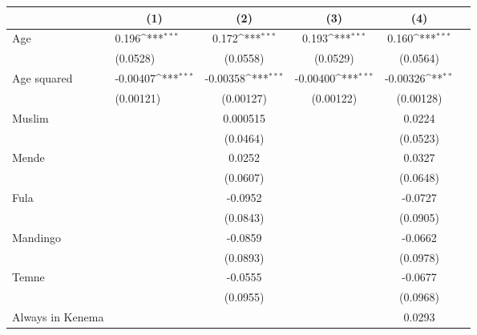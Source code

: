 {
\def\sym#1{\ifmmode^{#1}\else\(^{#1}\)\fi}
\begin{tabularx}{\textwidth}{Xl*{4}{c}}
\hline\hline
                    &\multicolumn{1}{c}{(1)}         &\multicolumn{1}{c}{(2)}         &\multicolumn{1}{c}{(3)}         &\multicolumn{1}{c}{(4)}         \\
\hline
Age                 &       0.196\sym{***}&       0.172\sym{***}&       0.193\sym{***}&       0.160\sym{***}\\
                    &    (0.0528)         &    (0.0558)         &    (0.0529)         &    (0.0564)         \\
[0.5em]
Age squared         &    -0.00407\sym{***}&    -0.00358\sym{***}&    -0.00400\sym{***}&    -0.00326\sym{**} \\
                    &   (0.00121)         &   (0.00127)         &   (0.00122)         &   (0.00128)         \\
[0.5em]
Muslim              &                     &    0.000515         &                     &      0.0224         \\
                    &                     &    (0.0464)         &                     &    (0.0523)         \\
[0.5em]
Mende               &                     &      0.0252         &                     &      0.0327         \\
                    &                     &    (0.0607)         &                     &    (0.0648)         \\
[0.5em]
Fula                &                     &     -0.0952         &                     &     -0.0727         \\
                    &                     &    (0.0843)         &                     &    (0.0905)         \\
[0.5em]
Mandingo            &                     &     -0.0859         &                     &     -0.0662         \\
                    &                     &    (0.0893)         &                     &    (0.0978)         \\
[0.5em]
Temne               &                     &     -0.0555         &                     &     -0.0677         \\
                    &                     &    (0.0955)         &                     &    (0.0968)         \\
[0.5em]
Always in Kenema    &                     &                     &                     &      0.0293         \\

\end{tabularx}}
